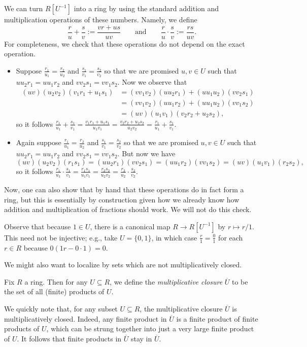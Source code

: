 We can turn $R\left[U^{-1}\right]$ into a ring by using the standard addition and multiplication operations of these numbers. Namely, we define
\[\frac{r}{u}+\frac{s}{v}:=\frac{vr+us}{uv}\qquad\text{and}\qquad\frac ru\cdot\frac sv:=\frac{rs}{uv}.\]
For completeness, we check that these operations do not depend on the exact operation.
\begin{itemize}
	\item Suppose $\frac{r_1}{u_1}=\frac{r_2}{u_2}$ and $\frac{s_1}{v_1}=\frac{s_2}{v_2}$ so that we are promised $u,v\in U$ such that $uu_2r_1=uu_1r_2$ and $vv_2s_1=vv_1s_2$. Now we observe that
	\begin{align*}
		(uv)(u_2v_2)(v_1r_1+u_1s_1) &= (vv_1v_2)(uu_2r_1)+(uu_1u_2)(vv_2s_1) \\
		&= (vv_1v_2)(uu_1r_2)+(uu_1u_2)(vv_1s_2) \\
		&= (uv)(u_1v_1)(v_2r_2+u_2s_2),
	\end{align*}
	so it follows $\frac{r_1}{u_1}+\frac{s_1}{v_1}=\frac{v_1r_1+u_1s_1}{u_1v_1}=\frac{v_2r_2+u_2s_2}{u_2v_2}=\frac{r_1}{u_1}+\frac{s_1}{v_1}$.
	\item Again suppose $\frac{r_1}{u_1}=\frac{r_2}{u_2}$ and $\frac{s_1}{v_1}=\frac{s_2}{v_2}$ so that we are promised $u,v\in U$ such that $uu_2r_1=uu_1r_2$ and $vv_2s_1=vv_1s_2$. But now we have
	\[(uv)(u_2v_2)(r_1s_1) = (uu_2r_1)(vv_2s_1)=(uu_1r_2)(vv_1s_2)=(uv)(u_1v_1)(r_2s_2),\]
	so it follows $\frac{r_1}{u_1}\cdot\frac{s_1}{v_1}=\frac{r_1s_1}{u_1v_1}=\frac{r_2s_2}{u_2v_2}=\frac{r_2}{u_2}\cdot\frac{s_2}{v_2}$.
\end{itemize}
Now, one can also show that by hand that these operations do in fact form a ring, but this is essentially by construction given how we already know how addition and multiplication of fractions should work. We will not do this check.
\begin{remark}
	Observe that because $1\in U$, there is a canonical map $R\to R\left[U^{-1}\right]$ by $r\mapsto r/1$. This need not be injective; e.g., take $U=\{0,1\}$, in which case $\frac r1=\frac01$ for each $r\in R$ because $0(1r-0\cdot1)=0$.
\end{remark}

We might also want to localize by sets which are not multiplicatively closed.
\begin{definition}
	Fix $R$ a ring. Then for any $U\subseteq R$, we define the \textit{multiplicative closure} $\overline U$ to be the set of all (finite) products of $U$.
\end{definition}
We quickly note that, for any subset $U\subseteq R$, the multiplicative closure $\overline U$ is multiplicatively closed. Indeed, any finite product in $\overline U$ is a finite product of finite products of $U$, which can be strung together into just a very large finite product of $U$. It follows that finite products in $\overline U$ stay in $\overline U$.

